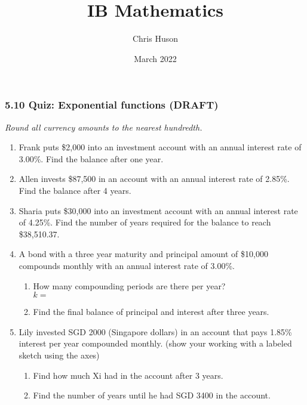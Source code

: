 \documentclass[12pt, twoside]{article}
\title{IB Mathematics}
\author{Chris Huson}
\date{March 2022}
\begin{document}
\subsubsection*{5.10 Quiz: Exponential functions (DRAFT)}
\emph{Round all currency amounts to the nearest hundredth.}
\begin{enumerate}
\item Frank puts \$2,000 into an investment account with an annual interest rate of 3.00\%. Find the balance after one year. \vspace{1.5cm}

\item Allen invests \$87,500 in an account with an annual interest rate of 2.85\%. Find the balance after 4 years. \vspace{1.5cm}

\item Sharia puts \$30,000 into an investment account with an annual interest rate of 4.25\%. Find the number of years required for the balance to reach \$38,510.37. \vspace{2cm}

\item A bond with a three year maturity and principal amount of \$10,000 compounds monthly with an annual interest rate of 3.00\%.
\begin{enumerate}[itemsep=0.5cm]
    \item How many compounding periods are there per year? \\[0.25cm]
    $k=$
    \item Find the final balance of principal and interest after three years.
\end{enumerate} \vspace{1.5cm}

\item Lily invested SGD 2000 (Singapore dollars) in an account that pays 1.85\% interest per year compounded monthly. (show your working with a labeled sketch using the axes)
\begin{multicols}{2}
    \begin{enumerate}[itemsep=1cm]
        \item Find how much Xi had in the account after 3 years.
        \item Find the number of years until he had SGD 3400 in the account.
    \end{enumerate} \vspace{0.5cm}
    \begin{center}
    \end{center}
\end{multicols}



\end{enumerate}
\end{document}
